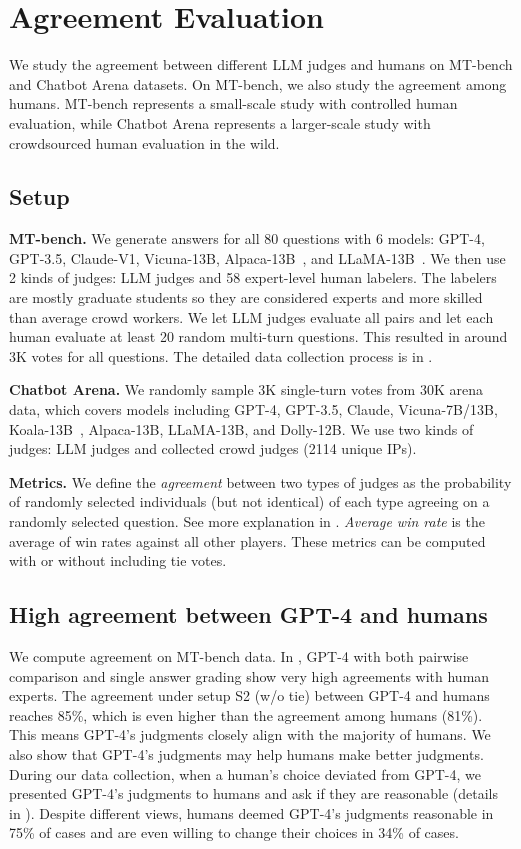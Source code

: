 \section{Agreement Evaluation}
\label{sec:agreement_eval}

We study the agreement between different LLM judges and humans on MT-bench and Chatbot Arena datasets. On MT-bench, we also study the agreement among humans. MT-bench represents a small-scale study with controlled human evaluation, while Chatbot Arena represents a larger-scale study with crowdsourced human evaluation in the wild.
\subsection{Setup}

\textbf{MT-bench.}
We generate answers for all 80 questions with 6 models: GPT-4, GPT-3.5, Claude-V1, Vicuna-13B, Alpaca-13B~\cite{alpaca}, and LLaMA-13B~\cite{touvron2023llama}. We then use 2 kinds of judges: LLM judges and 58 expert-level human labelers. The labelers are mostly graduate students so they are considered experts and more skilled than average crowd workers.
We let LLM judges evaluate all pairs and let each human evaluate at least 20 random multi-turn questions. This resulted in around 3K votes for all questions.
The detailed data collection process is in .

\textbf{Chatbot Arena.}
We randomly sample 3K single-turn votes from 30K arena data, which covers models including GPT-4,  GPT-3.5, Claude, Vicuna-7B/13B, Koala-13B~\cite{koala}, Alpaca-13B, LLaMA-13B, and Dolly-12B. We use two kinds of judges: LLM judges and collected crowd judges (2114 unique IPs).


\textbf{Metrics.}
We define the \textit{agreement} between two types of judges as the probability of randomly selected individuals (but not identical) of each type agreeing on a randomly selected question.
See more explanation in .
\textit{Average win rate} is the average of win rates against all other players.
These metrics can be computed with or without including tie votes.

\subsection{High agreement between GPT-4 and humans}
\label{sec:agreement}

We compute agreement on MT-bench data.
In , GPT-4 with both pairwise comparison and single answer grading show very high agreements with human experts.
The agreement under setup S2 (w/o tie) between GPT-4 and humans reaches 85\%, which is even higher than the agreement among humans (81\%). This means GPT-4's judgments closely align with the majority of humans.
We also show that GPT-4's judgments may help humans make better judgments. During our data collection, when a human's choice deviated from GPT-4, we presented GPT-4's judgments to humans and ask if they are reasonable (details in ). Despite different views, humans deemed GPT-4's judgments reasonable in 75\% of cases and are even willing to change their choices in 34\% of cases.


